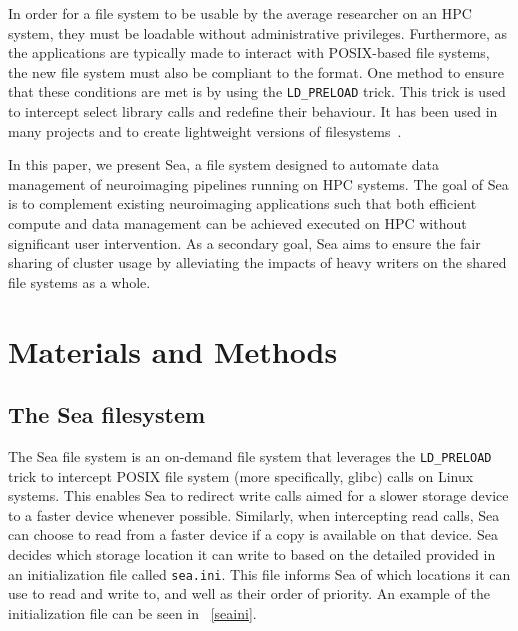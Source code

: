     In order for a file system to be usable by the average researcher on an HPC system, they must be loadable without administrative
    privileges. Furthermore, as the applications are typically made to interact with POSIX-based file systems, the new file system must
    also be compliant to the format. One method to ensure that these conditions are met is by using the \texttt{LD\_PRELOAD} trick. This trick is
    used to intercept select library calls and redefine their behaviour. It has been used in many projects and to create lightweight versions
    of filesystems~\cite{xtreemfs}. 
    
    In this paper, we present Sea, a file system designed to automate data management of neuroimaging pipelines running on HPC systems.
    The goal of Sea is to complement existing neuroimaging applications such that both efficient compute and data management can be achieved
    executed on HPC without significant user intervention. As a secondary goal, Sea aims to ensure the fair sharing of cluster usage
    by alleviating the impacts of heavy writers on the shared file systems as a whole. 
    
    
    
    
    
    
    \section{Materials and Methods}
    
    \subsection{The Sea filesystem}
    
    The Sea file system is an on-demand file system that leverages the \texttt{LD\_PRELOAD} trick to intercept POSIX file system (more specifically, glibc)
    calls on Linux systems. This enables Sea to redirect write calls aimed for a slower storage device to a faster device whenever
    possible. Similarly, when intercepting read calls, Sea can choose to read from a faster device if a copy is available on that device.
    Sea decides which storage location it can write to based on the detailed provided in an initialization file called \texttt{sea.ini}. 
    This file informs Sea of which locations it can use to read and write to, and well as their order of priority. An example of the initialization
    file can be seen in ~\ref{seaini}.
    

